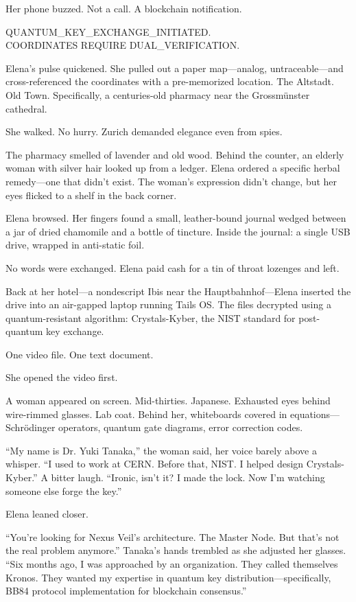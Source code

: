 \documentclass[12pt,oneside]{book}
\begin{document}
Her phone buzzed. Not a call. A blockchain notification.

\begin{terminalbox}
QUANTUM\_KEY\_EXCHANGE\_INITIATED.\\
COORDINATES REQUIRE DUAL\_VERIFICATION.
\end{terminalbox}

Elena's pulse quickened. She pulled out a paper map—analog, untraceable—and cross-referenced the coordinates with a pre-memorized location. The Altstadt. Old Town. Specifically, a centuries-old pharmacy near the Grossmünster cathedral.

She walked. No hurry. Zurich demanded elegance even from spies.

The pharmacy smelled of lavender and old wood. Behind the counter, an elderly woman with silver hair looked up from a ledger. Elena ordered a specific herbal remedy—one that didn't exist. The woman's expression didn't change, but her eyes flicked to a shelf in the back corner.

Elena browsed. Her fingers found a small, leather-bound journal wedged between a jar of dried chamomile and a bottle of tincture. Inside the journal: a single USB drive, wrapped in anti-static foil.

No words were exchanged. Elena paid cash for a tin of throat lozenges and left.

\vspace{1em}

Back at her hotel—a nondescript Ibis near the Hauptbahnhof—Elena inserted the drive into an air-gapped laptop running Tails OS. The files decrypted using a quantum-resistant algorithm: Crystals-Kyber, the NIST standard for post-quantum key exchange.

One video file. One text document.

She opened the video first.

A woman appeared on screen. Mid-thirties. Japanese. Exhausted eyes behind wire-rimmed glasses. Lab coat. Behind her, whiteboards covered in equations—Schrödinger operators, quantum gate diagrams, error correction codes.

``My name is Dr. Yuki Tanaka,'' the woman said, her voice barely above a whisper. ``I used to work at CERN. Before that, NIST. I helped design Crystals-Kyber.'' A bitter laugh. ``Ironic, isn't it? I made the lock. Now I'm watching someone else forge the key.''

Elena leaned closer.

``You're looking for Nexus Veil's architecture. The Master Node. But that's not the real problem anymore.'' Tanaka's hands trembled as she adjusted her glasses. ``Six months ago, I was approached by an organization. They called themselves Kronos. They wanted my expertise in quantum key distribution—specifically, BB84 protocol implementation for blockchain consensus.''
\end{document}

